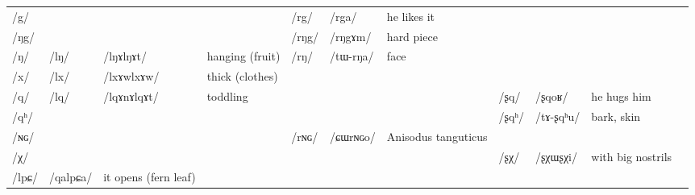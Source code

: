\documentclass[oldfontcommands,oneside,a4paper,11pt]{article}
\newcommand{\ipa}[1]{\mbox{/#1/}} %
\newcommand{\deux}[1]{/#1/}
\newcommand{\trois}[1]{/#1/}
\newcommand{\idph}[1]{\cellcolor{gray}\textbf{#1}}
\begin{document}
\begin{landscape}
\begin{table}[H]
{\begin{tabular}{l|lll|lll|lll|l}
\ipa{g}  & 	  & 	  & 	  & 	 \deux{rg}  & 	 \ipa{rga}  & 	 he likes it & 	 & 	 & 	 & 	\\	
\ipa{ŋg}  & 	  & 	  & 	  & 	 \deux{rŋg}  & 	 \ipa{rŋgɤm}  & 	hard piece  & 	 & 	 & 	 & 	\\	
\ipa{ŋ}  & 	 \deux{lŋ} \idph{}  & 	 \ipa{lŋɤlŋɤt}  & 	hanging (fruit)  & 	 \deux{rŋ}  & 	 \ipa{tɯ-rŋa}  & 	 face & 	 & 	 & 	 & 	\\	
\ipa{x}  & 	 \deux{lx} \idph{}  & 	 \ipa{lxɤwlxɤw}  & 	thick (clothes)  & 	  & 	  & 	  & 	 & 	 & 	 & 	\\	
\ipa{q}  & 	\deux{lq}  & \ipa{lqɤnɤlqɤt}	  &toddling	  & 	 & 	 & 	 & 	 \deux{ʂq}  & 	 \ipa{ʂqoʁ}  & 	he hugs him  & 	\\	
\ipa{qʰ}  & 	  & 	  & 	  & 	 & 	 & 	 & 	 \deux{ʂqʰ}  & 	 \ipa{tɤ-ʂqʰu}  & 	bark, skin & 	\\	
\ipa{ɴɢ}  & 	  & 	  & 	  & 	 \deux{rɴɢ}  & 	 \ipa{ɕɯrɴɢo}  & 	Anisodus tanguticus  & 	 & 	 & 	 & 	\\	
\ipa{χ}  & 	  & 	  & 	  & 	 & 	 & 	 & 	 \deux{ʂχ}  & 	 \ipa{ʂχɯʂχi}  & 	with big nostrils  & 	\\	
\midrule
\trois{lpɕ}	&\ipa{qalpɕa} & it opens (fern leaf) \\
\bottomrule
\end{tabular}}
\end{table}
 

\end{landscape}
\end{document}
